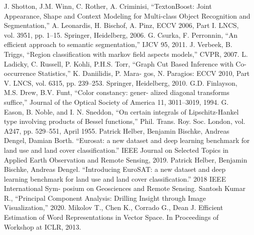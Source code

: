 \documentclass{article}
\begin{document}
\begin{multicols*}{2}
\fontsize{8pt}{10pt}\selectfont
\begin{thebibliography}{10}
    \bibitem{} J. Shotton, J.M. Winn, C. Rother, A. Criminisi, “TextonBoost:
    Joint Appearance, Shape and Context Modeling for Multi-class
    Object Recognition and Segmentation,” A. Leonardis, H. Bischof,
    A. Pinz, ECCV 2006, Part I. LNCS, vol. 3951, pp. 1–15. Springer,
    Heidelberg, 2006. \vspace{-7pt}
    \bibitem{} G. Csurka, F. Perronnin, “An efficient approach to semantic
    segmentation,” IJCV 95, 2011. \vspace{-7pt}
    \bibitem{} J. Verbeek, B. Triggs, “Region classification with markov field
    aspects models,” CVPR, 2007. \vspace{-7pt}
    \bibitem{} L. Ladicky, C. Russell, P. Kohli, P.H.S. Torr, “Graph Cut Based
    Inference with Co-occurrence Statistics,” K. Daniilidis, P. Mara-
    gos, N. Paragios: ECCV 2010, Part V. LNCS, vol. 6315, pp.
    239–253. Springer, Heidelberg, 2010.\vspace{-7pt}
    \bibitem{} G.D. Finlayson, M.S. Drew, B.V. Funt, “Color constancy: gener-
    alized diagonal transforms suffice,” Journal of the Optical Society
    of America 11, 3011–3019, 1994. \vspace{-7pt}
    \bibitem{} G. Eason, B. Noble, and I. N. Sneddon, “On certain integrals
    of Lipschitz-Hankel type involving products of Bessel functions,”
    Phil. Trans. Roy. Soc. London, vol. A247, pp. 529–551, April
    1955. \vspace{-7pt}
    \bibitem{} Patrick Helber, Benjamin Bischke, Andreas Dengel, Damian
    Borth. “Eurosat: a new dataset and deep learning benchmark for
    land use and land cover classification.” IEEE Journal on Selected
    Topics in Applied Earth Observation and Remote Sensing, 2019. \vspace{-7pt}
    \bibitem{} Patrick Helber, Benjamin Bischke, Andreas Dengel. “Introducing
    EuroSAT: a new dataset and deep learning benchmark for land
    use and land cover classification.” 2018 IEEE International Sym-
    posium on Geosciences and Remote Sensing. \vspace{-7pt}
    \bibitem{} Santosh Kumar R., “Principal Component Analysis: Drilling
    Insight through Image Visualization,” 2020. \vspace{-7pt}
    \bibitem{} Mikolov T., Chen K., Corrado G., Dean J. Efficient Estimation
    of Word Representations in Vector Space. In Proceedings of
    Workshop at ICLR, 2013.
\end{thebibliography}


\end{multicols*}
\end{document}
